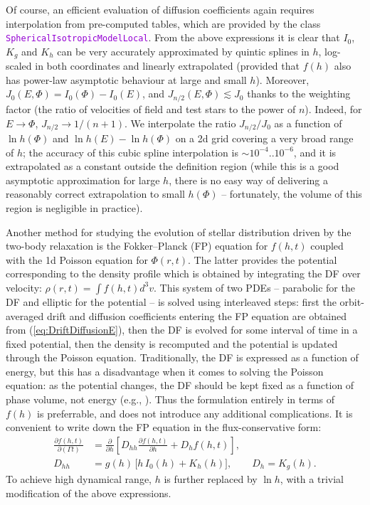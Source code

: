\documentclass[12pt]{article}
\newcommand{\ttt}[1]{\textcolor{darkviolet}{\texttt{#1}}}
\renewcommand{\d}{\partial}
\begin{document}
Of course, an efficient evaluation of diffusion coefficients again requires interpolation from pre-computed tables, which are provided by the class \ttt{SphericalIsotropicModelLocal}. From the above expressions it is clear that $I_0$, $K_g$ and $K_h$ can be very accurately approximated by quintic splines in $h$, log-scaled in both coordinates and linearly extrapolated (provided that $f(h)$ also has power-law asymptotic behaviour at large and small $h$). 
Moreover, $J_0(E,\Phi) = I_0(\Phi)-I_0(E)$, and $J_{n/2}(E,\Phi)\lesssim J_0$ thanks to the weighting factor (the ratio of velocities of field and test stars to the power of $n$). Indeed, for $E\to\Phi$, $J_{n/2} \to 1/(n+1)$. We interpolate the ratio $J_{n/2}/J_0$ as a function of $\ln h(\Phi)$ and $\ln h(E)-\ln h(\Phi)$ on a 2d grid covering a very broad range of $h$; the accuracy of this cubic spline interpolation is $\sim 10^{-4}..10^{-6}$, and it is extrapolated as a constant outside the definition region (while this is a good asymptotic approximation for large $h$, there is no easy way of delivering a reasonably correct extrapolation to small $h(\Phi)$ -- fortunately, the volume of this region is negligible in practice).

Another method for studying the evolution of stellar distribution driven by the two-body relaxation is the Fokker--Planck (FP) equation for $f(h,t)$ coupled with the 1d Poisson equation for $\Phi(r,t)$. The latter provides the potential corresponding to the density profile which is obtained by integrating the DF over velocity: $\rho(r,t)=\int f(h,t) d^3v$. This system of two PDEs -- parabolic for the DF and elliptic for the potential -- is solved using interleaved steps: first the orbit-averaged drift and diffusion coefficients entering the FP equation are obtained from (\ref{eq:DriftDiffusionE}), then the DF is evolved for some interval of time in a fixed potential, then the density is recomputed and the potential is updated through the Poisson equation.
Traditionally, the DF is expressed as a function of energy, but this has a disadvantage when it comes to solving the Poisson equation: as the potential changes, the DF should be kept fixed as a function of phase volume, not energy (e.g., \cite{Cohn1980}). Thus the formulation entirely in terms of $f(h)$ is preferrable, and does not introduce any additional complications. It is convenient to write down the FP equation in the flux-conservative form:
\begin{align}
\frac{\d f(h,t)}{\d (\Gamma t)} &= \frac{\d}{\d h} \left[ D_{hh} \frac{\d f(h,t)}{\d h} + D_h f(h,t) \right] , \label{eq:FokkerPlanck} \\
D_{hh} &= g(h)\,\big[ h\, I_0(h) + K_h(h) \big], \qquad D_h = K_g(h).  \label{eq:FokkerPlanckCoefs}
\end{align}
To achieve high dynamical range, $h$ is further replaced by $\ln h$, with a trivial modification of the above expressions.
\end{document}
